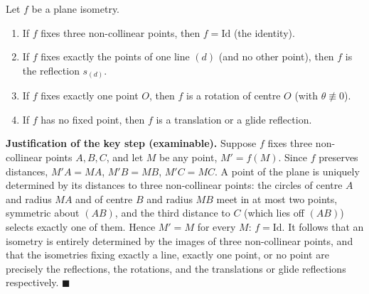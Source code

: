\documentclass[11pt]{article}
\begin{document}
\begin{propriete}
Let $f$ be a plane isometry.
\begin{enumerate}
\item If $f$ fixes three non-collinear points, then $f = \mathrm{Id}$ (the identity).
\item If $f$ fixes exactly the points of one line $(d)$ (and no other point), then $f$ is the reflection $s_{(d)}$.
\item If $f$ fixes exactly one point $O$, then $f$ is a rotation of centre $O$ (with $\theta \not\equiv 0$).
\item If $f$ has no fixed point, then $f$ is a translation or a glide reflection.
\end{enumerate}
\end{propriete}

\textbf{Justification of the key step (examinable).} Suppose $f$ fixes three non-collinear points $A, B, C$, and let $M$ be any point, $M' = f(M)$. Since $f$ preserves distances, $M'A = MA$, $M'B = MB$, $M'C = MC$. A point of the plane is uniquely determined by its distances to three non-collinear points: the circles of centre $A$ and radius $MA$ and of centre $B$ and radius $MB$ meet in at most two points, symmetric about $(AB)$, and the third distance to $C$ (which lies off $(AB)$) selects exactly one of them. Hence $M' = M$ for every $M$: $f = \mathrm{Id}$. It follows that an isometry is entirely determined by the images of three non-collinear points, and that the isometries fixing exactly a line, exactly one point, or no point are precisely the reflections, the rotations, and the translations or glide reflections respectively. \hfill$\blacksquare$
\end{document}
